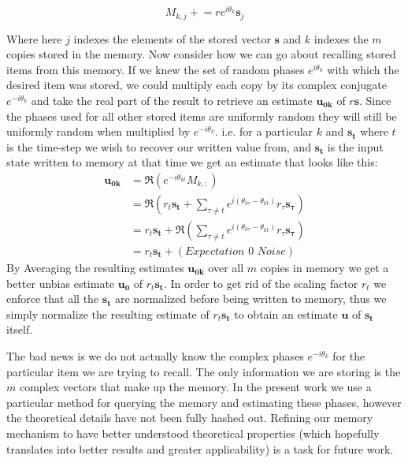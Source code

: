 \documentclass{article}
\begin{document}
$$M_{k,j}\mathrel{+}=re^{i\theta_k}\pmb{s}_j$$

Where here $j$ indexes the elements of the stored vector $\pmb{s}$ and $k$ indexes the $m$ copies stored in the memory. Now consider how we can go about recalling stored items from this memory. If we knew the set of random phases $e^{i\theta_k}$ with which the desired item was stored, we could multiply each copy by its complex conjugate $e^{-i\theta_k}$ and take the real part of the result to retrieve an estimate $\pmb{u_{0k}}$ of $r\pmb{s}$. Since the phases used for all other stored items are uniformly random they will still be uniformly random when multiplied by $e^{-i\theta_k}$. i.e. for a particular $k$ and $\pmb{s_t}$ where $t$ is the time-step we wish to recover our written value from, and $\pmb{s_t}$ is the input state written to memory at that time we get an estimate that looks like this:
\begin{align*}
\pmb{u_{0k}}&=\Re(e^{-i\theta_{kt}}M_{k,:})\\
&=\Re(r_t\pmb{s_t}+\sum_{\tau\neq t}e^{i(\theta_{k\tau}-\theta_{kt})}r_\tau\pmb{s_\tau})\\
&=r_t\pmb{s_t}+\Re(\sum_{\tau\neq t}e^{i(\theta_{k\tau}-\theta_{kt})}r_\tau\pmb{s_\tau})\\
&=r_t\pmb{s_t}+(\textit{Expectation 0 Noise})
\end{align*}
By Averaging the resulting estimates $\pmb{u_{0k}}$ over all $m$ copies in memory we get a better unbias estimate $\pmb{u_0}$ of $r_t\pmb{s_t}$. In order to get rid of the scaling factor $r_t$ we enforce that all the $\pmb{s_t}$ are normalized before being written to memory, thus we simply normalize the resulting estimate of $r_t\pmb{s_t}$ to obtain an estimate $\pmb{u}$ of $\pmb{s_t}$ itself.

The bad news is we do not actually know the complex phases $e^{-i\theta_k}$ for the particular item we are trying to recall. The only information we are storing is the $m$ complex vectors that make up the memory. In the present work we use a particular method for querying the memory and estimating these phases, however the theoretical details have not been fully hashed out. Refining our memory mechanism to have better understood theoretical properties (which hopefully translates into better results and greater applicability) is a task for future work.
\end{document}
